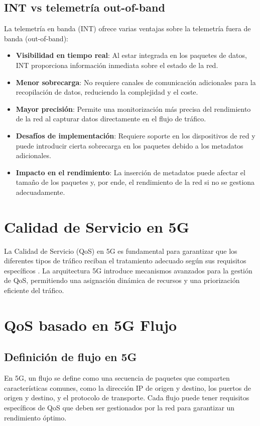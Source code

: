 \subsection{INT vs telemetría out-of-band}
La telemetría en banda (INT) ofrece varias ventajas sobre la telemetría fuera de banda (out-of-band):
\begin{itemize}
    \item \textbf{Visibilidad en tiempo real}: Al estar integrada en los paquetes de datos, INT proporciona información inmediata sobre el estado de la red.
    \item \textbf{Menor sobrecarga}: No requiere canales de comunicación adicionales para la recopilación de datos, reduciendo la complejidad y el coste.
    \item \textbf{Mayor precisión}: Permite una monitorización más precisa del rendimiento de la red al capturar datos directamente en el flujo de tráfico.
    \item \textbf{Desafíos de implementación}: Requiere soporte en los dispositivos de red y puede introducir cierta sobrecarga en los paquetes debido a los metadatos adicionales.
    \item \textbf{Impacto en el rendimiento}: La inserción de metadatos puede afectar el tamaño de los paquetes y, por ende, el rendimiento de la red si no se gestiona adecuadamente.
\end{itemize}

\section{Calidad de Servicio en 5G}
La Calidad de Servicio (QoS) en 5G es fundamental para garantizar que los diferentes tipos de tráfico reciban el tratamiento adecuado según sus requisitos específicos \cite{3gpp.ts.23.503}. La arquitectura 5G introduce mecanismos avanzados para la gestión de QoS, permitiendo una asignación dinámica de recursos y una priorización eficiente del tráfico.

\section{QoS basado en 5G Flujo}
\subsection{Definición de flujo en 5G}
En 5G, un flujo se define como una secuencia de paquetes que comparten características comunes, como la dirección IP de origen y destino, los puertos de origen y destino, y el protocolo de transporte. Cada flujo puede tener requisitos específicos de QoS que deben ser gestionados por la red para garantizar un rendimiento óptimo.

